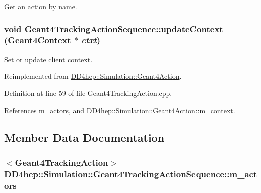 Get an action by name. \hypertarget{class_d_d4hep_1_1_simulation_1_1_geant4_tracking_action_sequence_a7afac2362f030a76e39cbdc7ab5b0ee7}{
\subsubsection[{updateContext}]{\setlength{\rightskip}{0pt plus 5cm}void Geant4TrackingActionSequence::updateContext ({\bf Geant4Context} $\ast$ {\em ctxt})}}
\label{class_d_d4hep_1_1_simulation_1_1_geant4_tracking_action_sequence_a7afac2362f030a76e39cbdc7ab5b0ee7}


Set or update client context. 

Reimplemented from \hyperlink{class_d_d4hep_1_1_simulation_1_1_geant4_action_ae3b9daf2af881df956c46568c0743313}{DD4hep::Simulation::Geant4Action}.

Definition at line 59 of file Geant4TrackingAction.cpp.

References m\_\-actors, and DD4hep::Simulation::Geant4Action::m\_\-context.

\subsection{Member Data Documentation}
\hypertarget{class_d_d4hep_1_1_simulation_1_1_geant4_tracking_action_sequence_a198136b8ba82d7de2c4d94e631b79970}{
\subsubsection[{m\_\-actors}]{$<${\bf Geant4TrackingAction}$>$ {\bf DD4hep::Simulation::Geant4TrackingActionSequence::m\_\-actors}}}
\label{class_d_d4hep_1_1_simulation_1_1_geant4_tracking_action_sequence_a198136b8ba82d7de2c4d94e631b79970}


